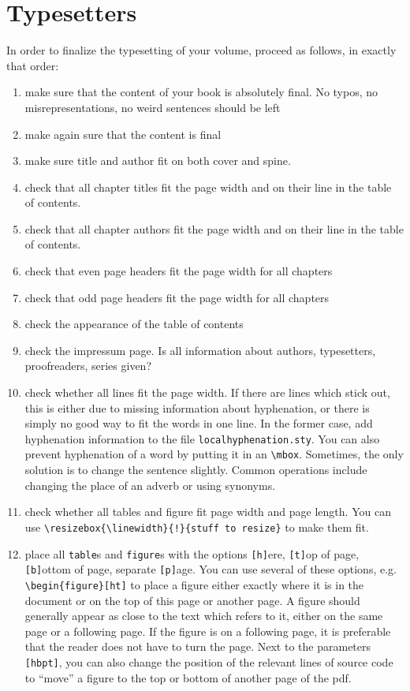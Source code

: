\chapter{Typesetters}
In order to finalize the typesetting of your volume, proceed as follows, in exactly that order:

\begin{enumerate}
 \item make sure that the content of your book is absolutely final. No typos, no misrepresentations, no weird sentences should be left
 \item make again sure that the content is final 
 \item make sure title and author fit on both cover and spine. 
 \item check that all chapter titles fit the page width and on their line in the table of contents. 
 \item check that all chapter authors fit the page width and on their line in the table of contents. 
 \item check that even page headers fit the page width for all chapters
 \item check that odd page headers fit the page width for all chapters
 \item check the appearance of the table of contents
 \item check the impressum page. Is all information about authors, typesetters, proofreaders, series given?
 \item check whether all lines fit the page width. If there are lines which stick out, this is either due to missing information about hyphenation, or there is simply no good way to fit the words in one line. In the former case, add hyphenation information to the file \verb+localhyphenation.sty+. You can also prevent hyphenation of a word by putting it in an \verb+\mbox+. Sometimes, the only solution is to change the sentence slightly. Common operations include changing the place of an adverb or using synonyms.
 \item check whether all tables and figure fit page width and page length. You can use \verb+\resizebox{\linewidth}{!}{stuff to resize}+ to make them fit.
 \item place all \verb+table+s and \verb+figure+s with the options 
\verb+[h]+ere, 
\verb+[t]+op of page, 
\verb+[b]+ottom of page,
separate \verb+[p]+age. You can use several of these options, e.g. \verb+\begin{figure}[ht]+ to place a figure either exactly where it is in the document or on the top of this page or another page.  A figure should generally appear as close to the text which refers to it, either on the same page or a following page. If the figure is on a following page, it is preferable that the reader does not have to turn the page. Next to the parameters \verb+[hbpt]+, you can also change the position of the relevant lines of source code to ``move'' a figure to the top or bottom of another page of the pdf. 

\end{enumerate}
